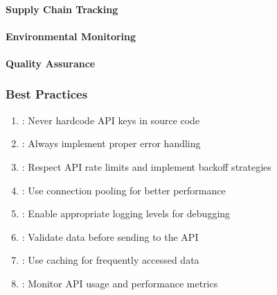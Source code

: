 \documentclass[letterpaper,10pt,english]{sphinxmanual}
\begin{document}
\paragraph{Supply Chain Tracking}
\label{\detokenize{api/client-libraries:supply-chain-tracking}}

\paragraph{Environmental Monitoring}
\label{\detokenize{api/client-libraries:environmental-monitoring}}

\paragraph{Quality Assurance}
\label{\detokenize{api/client-libraries:quality-assurance}}

\subsubsection{Best Practices}
\label{\detokenize{api/client-libraries:best-practices}}\begin{enumerate}
%
\item {} 
\sphinxAtStartPar
{}: Never hardcode API keys in source code

\item {} 
\sphinxAtStartPar
{}: Always implement proper error handling

\item {} 
\sphinxAtStartPar
{}: Respect API rate limits and implement backoff strategies

\item {} 
\sphinxAtStartPar
{}: Use connection pooling for better performance

\item {} 
\sphinxAtStartPar
{}: Enable appropriate logging levels for debugging

\item {} 
\sphinxAtStartPar
{}: Validate data before sending to the API

\item {} 
\sphinxAtStartPar
{}: Use caching for frequently accessed data

\item {} 
\sphinxAtStartPar
{}: Monitor API usage and performance metrics

\end{enumerate}
\end{document}

